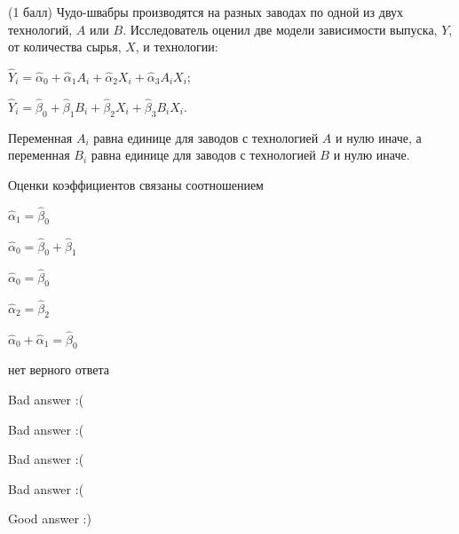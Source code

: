 
\begin{question}
(1 балл) Чудо-швабры производятся на разных заводах по одной из двух технологий,
\(A\) или \(B\). Исследователь оценил две модели зависимости выпуска,
\(Y\), от количества сырья, \(X\), и технологии:

\(\hat Y_i = \hat \alpha_0 + \hat\alpha_1 A_i + \hat\alpha_2 X_i + \hat\alpha_3 A_i X_i\);

\(\hat Y_i = \hat \beta_0 + \hat\beta_1 B_i + \hat\beta_2 X_i + \hat\beta_3 B_i X_i\).

Переменная \(A_i\) равна единице для заводов с технологией \(A\) и нулю
иначе, а переменная \(B_i\) равна единице для заводов с технологией
\(B\) и нулю иначе.

Оценки коэффициентов связаны соотношением
\begin{answerlist}
  \item \(\hat\alpha_1 = \hat\beta_0\)
  \item \(\hat\alpha_0 = \hat\beta_0 + \hat\beta_1\)
  \item \(\hat\alpha_0 = \hat\beta_0\)
  \item \(\hat\alpha_2 = \hat\beta_2\)
  \item \(\hat\alpha_0 + \hat\alpha_1 = \hat\beta_0\)
  \item нет верного ответа
\end{answerlist}
\end{question}

\begin{solution}
\begin{answerlist}
  \item Bad answer :(
  \item Bad answer :(
  \item Bad answer :(
  \item Bad answer :(
  \item Good answer :)
\end{answerlist}
\end{solution}
